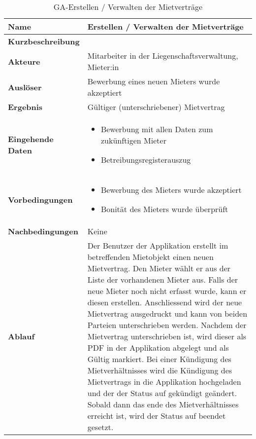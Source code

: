 \begin{table}[H]
  \centering
  \settowidth{}
  \setlength\extrarowheight{2pt}
  \begin{tabulary}{1.0\textwidth}{|a|m{12cm}|}
    \hline
    \textbf{Name}& Erstellen / Verwalten der Mietverträge\\
    \hline 
    \textbf{Kurzbeschreibung} & \\
    \hline
    \textbf{Akteure} & Mitarbeiter in der Liegenschaftsverwaltung, Mieter:in\\
    \hline
    \textbf{Auslöser} & Bewerbung eines neuen Mieters wurde akzeptiert\\
    \hline
    \textbf{Ergebnis} & Gültiger (unterschriebener) Mietvertrag\\
    \hline
    \textbf{Eingehende Daten} & 
    \begin{itemize}
      \item Bewerbung mit allen Daten zum zukünftigen Mieter
      \item Betreibungsregisterauszug
    \end{itemize}\\
    \hline
    \textbf{Vorbedingungen} & 
    \begin{itemize}
      \item Bewerbung des Mieters wurde akzeptiert
      \item Bonität des Mieters wurde überprüft
    \end{itemize}\\
    \hline
    \textbf{Nachbedingungen} & Keine\\
    \hline
    \textbf{Ablauf} & Der Benutzer der Applikation erstellt im betreffenden Mietobjekt einen neuen Mietvertrag. Den Mieter wählt er aus der Liste der vorhandenen Mieter aus. Falls der neue Mieter noch nicht erfasst wurde, kann er diesen erstellen. Anschliessend wird der neue Mietvertrag ausgedruckt und kann von beiden Parteien unterschrieben werden. Nachdem der Mietvertrag unterschrieben ist, wird dieser als PDF in der Applikation abgelegt und als Gültig markiert. Bei einer Kündigung des Mietverhältnisses wird die Kündigung des Mietvertrags in die Applikation hochgeladen und der der Status auf gekündigt geändert. Sobald dann das ende des Mietverhältnisses erreicht ist, wird der Status auf beendet gesetzt.\\
    \hline
  \end{tabulary}
  \caption{GA-Erstellen / Verwalten der Mietverträge}
\end{table}

